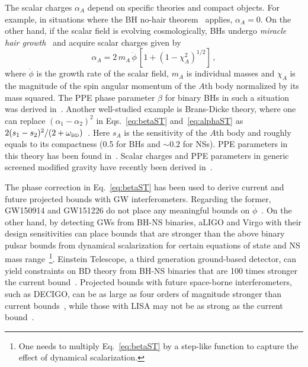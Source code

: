 \documentclass[prd,twocolumn,nofootinbib]{revtex4-1}
\newcommand\be{\begin{equation}}
\newcommand\ee{\end{equation}}
\newcommand{\BD}{{\mbox{\tiny BD}}}
\begin{document}
The scalar charges $\alpha_A$ depend on specific theories and compact objects. For example, in situations where the BH no-hair theorem~\cite{Hawking:1972qk,Bekenstein:1995un,Sotiriou:2011dz} applies, $\alpha_A = 0$. On the other hand, if the scalar field is evolving cosmologically, BHs undergo \emph{miracle hair growth}~\cite{Jacobson:1999vr} and acquire scalar charges given by~\cite{Horbatsch:2011ye}
\be
\alpha_A = 2 \, m_A \, \dot \phi\, [1+(1-\chi_A^2)^{1/2}]\,,
\ee
where $\dot{\phi}$ is the growth rate of the scalar field, $m_A$ is individual masses and $\chi_A$ is the magnitude of the spin angular momentum of the $\mathit{A}\text{th}$ body normalized by its mass squared. The PPE phase parameter $\beta$ for binary BHs in such a situation was derived in~\cite{Yunes:2016jcc}. Another well-studied example is Brans-Dicke theory, where one can replace $(\alpha_1-\alpha_2)^2$ in Eqs.~\eqref{eq:betaST} and~\eqref{eq:alphaST} as $2 (s_1-s_2)^2/(2+\omega_\BD)$~\cite{Freire:2012mg}. Here $s_A$ is the sensitivity of the $A$th body and roughly equals to its compactness (0.5 for BHs and $\sim 0.2$ for NSs). PPE parameters in this theory has been found in~\cite{Chatziioannou:2012rf}. Scalar charges and PPE parameters in generic screened modified gravity have recently been derived in~\cite{Zhang:2017srh,Liu:2018sia}.

The phase correction in Eq.~\eqref{eq:betaST} has been used to derive current and future projected bounds with GW interferometers. Regarding the former, GW150914 and GW151226 do not place any meaningful bounds on $\dot \phi$~\cite{Yunes:2016jcc}. On the other hand, by detecting GWs from BH-NS binaries, aLIGO and Virgo with their design sensitivities can place bounds that are stronger than the above binary pulsar bounds from dynamical scalarization for certain equations of state and NS mass range~\cite{Shibata:2013pra,Taniguchi:2014fqa,Sampson:2014qqa,Shao:2017gwu}\footnote{One needs to multiply Eq.~\eqref{eq:betaST} by a step-like function to capture the effect of dynamical scalarization.}. Einstein Telescope, a third generation ground-based detector, can yield constraints on BD theory from BH-NS binaries that are 100 times stronger the current bound~\cite{Zhang:2017sym}. Projected bounds with future space-borne interferometers, such as DECIGO, can be as large as four orders of magnitude stronger than current bounds~\cite{Yagi:2009zz}, while those with LISA may not be as strong as the current bound~\cite{Berti:2004bd,Yagi:2009zm}. 


\end{document}
